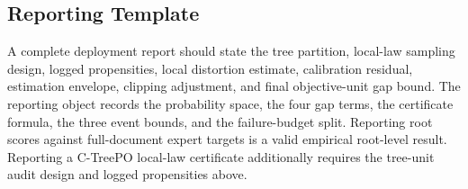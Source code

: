 \subsection{Reporting Template}

A complete deployment report should state the tree partition, local-law
sampling design, logged propensities, local distortion estimate, calibration
residual, estimation envelope, clipping adjustment, and final objective-unit
gap bound. The reporting object records the probability space, the four
gap terms, the certificate formula, the three event bounds, and the
failure-budget split. Reporting root scores against full-document expert
targets is a valid empirical root-level result. Reporting a C-TreePO local-law
certificate additionally requires the tree-unit audit design and logged
propensities above.
